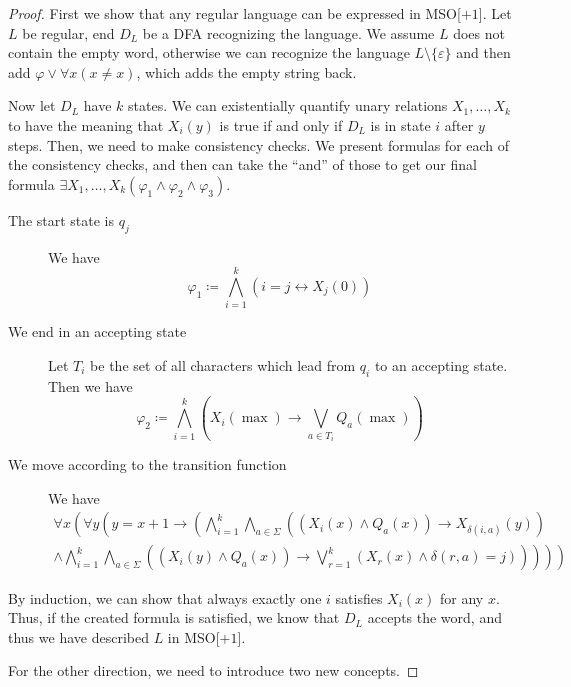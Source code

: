 \begin{proof}
    First we show that any regular language can be expressed in \acs{MSO}[$+1$].
    Let $L$ be regular, end $D_L$ be a DFA recognizing the language.
    We assume $L$ does not contain the empty word, otherwise we can recognize the language $L \setminus \{\varepsilon\}$ and then add $\varphi \lor \forall x(x \neq x)$, which adds the empty string back.

    Now let $D_L$ have $k$ states.
    We can existentially quantify unary relations $X_1, \dots, X_k$ to have the meaning that $X_i(y)$ is true if and only if $D_L$ is in state $i$ after $y$ steps.
    Then, we need to make consistency checks.
    We present formulas for each of the consistency checks, and then can take the ``and'' of those to get our final formula $\exists X_1, \dots, X_k(\varphi_1 \land \varphi_2 \land \varphi_3)$.
    \begin{description}
        \item[The start state is $q_j$] We have \[\varphi_1 \coloneqq \bigwedge_{i = 1}^{k} (i = j \leftrightarrow X_j(0))\]
        \item[We end in an accepting state] Let $T_i$ be the set of all characters which lead from $q_i$ to an accepting state.
        Then we have
        \[
            \varphi_2 \coloneqq \bigwedge_{i = 1}^{k}\left(X_i(\max) \to \bigvee_{a \in T_i} Q_a(\max)\right)
        \]
        \item[We move according to the transition function] We have
        \begin{align*}
            \forall x\left( \forall y \left( y = x + 1 \to \left(\bigwedge_{i = 1}^{k} \bigwedge_{a \in \Sigma} \left(\left(X_i(x) \land Q_a(x)\right) \to X_{\delta(i, a)}(y)\right) \right. \right. \right. \\
            \left. \left. \left.\land \bigwedge_{i = 1}^{k}\bigwedge_{a \in \Sigma} \left(\left(X_i(y) \land Q_a(x)\right) \to \bigvee_{r = 1}^{k}\left(X_r(x) \land \delta(r, a) = j\right)\right)  \right)  \right) \right)
        \end{align*}
    \end{description}
    By induction, we can show that always exactly one $i$ satisfies $X_i(x)$ for any $x$.
    Thus, if the created formula is satisfied, we know that $D_L$ accepts the word, and thus we have described $L$ in \acs{MSO}[$+1$].

    \vspace{5mm}

    For the other direction, we need to introduce two new concepts.


\end{proof}
